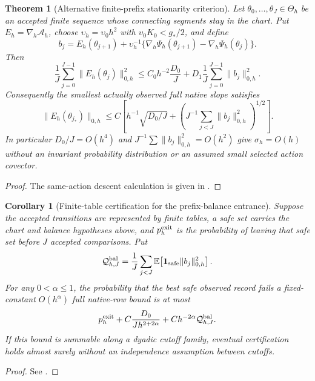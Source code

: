 \documentclass[11pt]{article}
\numberwithin{equation}{section}
\newtheorem{theorem}{Theorem}[section]
\newtheorem{corollary}[corollary]{Corollary}
\theoremstyle{definition}
\theoremstyle{remark}
\newcommand{\norm}[1]{\lVert#1\rVert}
\begin{document}
\begin{theorem}[Alternative finite-prefix stationarity criterion]
\label{thm:prefix-stationarity}
Let $\theta_0,\ldots,\theta_J\in\Theta_h$ be an accepted finite sequence whose connecting segments stay in the chart.  Put $E_h=\nabla_h\mathcal A_h$, choose $\upsilon_h=\upsilon_0h^2$ with $\upsilon_0K_0<g_*/2$, and define
\begin{equation}
 b_j=E_h(\theta_{j+1})
 +\upsilon_h^{-1}\{\nabla_h\Psi_h(\theta_{j+1})-\nabla_h\Psi_h(\theta_j)\}.
 \label{eq:prefix-balance}
\end{equation}
Then
\begin{equation}
 \frac1J\sum_{j=0}^{J-1}\norm{E_h(\theta_j)}_{0,h}^2
 \le C_0h^{-2}\frac{D_0}{J}
 +D_1\frac1J\sum_{j=0}^{J-1}\norm{b_j}_{0,h}^2.
 \label{eq:prefix-average}
\end{equation}
Consequently the smallest actually observed full native slope satisfies
\begin{equation}
 \norm{E_h(\theta_{j_*})}_{0,h}
 \le C\left[h^{-1}\sqrt{D_0/J}
 +\left(J^{-1}\sum_{j<J}\norm{b_j}_{0,h}^2\right)^{1/2}\right].
 \label{eq:prefix-selected}
\end{equation}
In particular $D_0/J=O(h^4)$ and $J^{-1}\sum\norm{b_j}_{0,h}^2=O(h^2)$ give $\sigma_h=O(h)$ without an invariant probability distribution or an assumed small selected action covector.
\end{theorem}
\begin{proof}
The same-action descent calculation is given in .
\end{proof}

\begin{corollary}[Finite-table certification for the prefix-balance entrance]
\label{cor:prefix-table}
Suppose the accepted transitions are represented by finite tables, a safe set carries the chart and balance hypotheses above, and $p_h^{\rm exit}$ is the probability of leaving that safe set before $J$ accepted comparisons.  Put
\begin{equation}
 \mathcal Q_{h,J}^{\rm bal}
 =\frac1J\sum_{j<J}\mathbb E\!\left[
   \mathbf 1_{\rm safe}\norm{b_j}_{0,h}^2\right].
 \label{eq:prefix-table-balance}
\end{equation}
For any $0<\alpha\le1$, the probability that the best safe observed record fails a fixed-constant $O(h^\alpha)$ full native-row bound is at most
\begin{equation}
 p_h^{\rm exit}
 +C\frac{D_0}{J h^{2+2\alpha}}
 +C h^{-2\alpha}\mathcal Q_{h,J}^{\rm bal}.
 \label{eq:prefix-table-probability}
\end{equation}
If this bound is summable along a dyadic cutoff family, eventual certification holds almost surely without an independence assumption between cutoffs.
\end{corollary}
\begin{proof}
See .
\end{proof}
\end{document}
